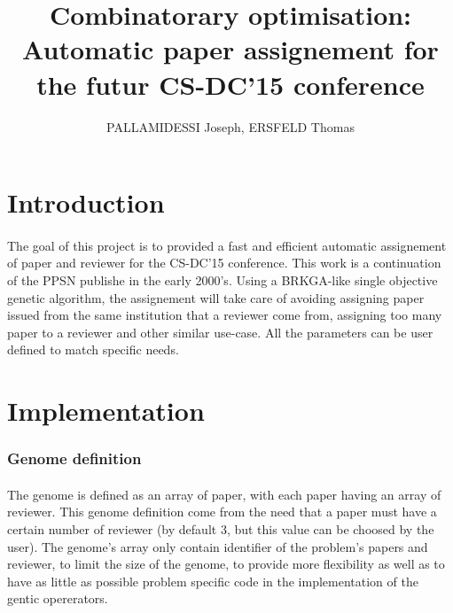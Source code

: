 \documentclass{article}
\begin{document}
  
  \title{Combinatorary optimisation: \\
    \large Automatic paper assignement for the futur CS-DC'15 conference}
  \author{PALLAMIDESSI Joseph, ERSFELD Thomas}
  \maketitle
  
  \section{Introduction} %
  \label{sec:Intr}
    \paragraph{} %
    \label{par:}
    The goal of this project is to provided a fast and efficient automatic
    assignement of paper and reviewer for the CS-DC'15 conference. 
    This work is a continuation of the PPSN\cite{} publishe in the early 2000's. 
    Using a BRKGA\cite{}-like single objective genetic algorithm, the assignement will
    take care of avoiding assigning paper issued from the same institution that a
    reviewer come from, assigning too many paper to a reviewer and other similar
    use-case. All the parameters can be user defined to match specific needs. 


  \section{Implementation} %
  \label{sec:Implementation}
    \subsubsection{Genome definition} %
    \label{ssub:Genome definition}
      
      \paragraph{} %
      \label{par:}
        The genome is defined as an array of paper, with each paper having an array of
        reviewer. This genome definition come from the need that a paper must have a
        certain number of reviewer (by default 3, but this value can be choosed by
        the user). The genome's array only contain identifier of the problem's
        papers and reviewer, to limit the size of the genome, to provide more
        flexibility  as well as to have as
        little as possible problem specific code in the implementation of the gentic
        opererators.
      
\end{document}
